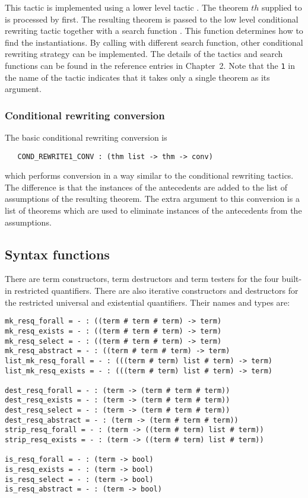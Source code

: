 This tactic is implemented using a lower level tactic .
The theorem $th$ supplied to  is processed by
 first. The resulting theorem is passed to the low
level conditional rewriting tactic  together with a
search function . This function determines how to
find the instantiations. By calling  with different
search function, other conditional rewriting strategy can be
implemented. The details of the tactics and search functions can be
found in the reference entries in Chapter~2.
Note that the {\tt 1} in the name of the tactic indicates that it
takes only a single theorem as its argument.

\subsubsection{Conditional rewriting conversion}

The basic conditional rewriting conversion is
\begin{boxed}
\begin{verbatim}
   COND_REWRITE1_CONV : (thm list -> thm -> conv)
\end{verbatim}
\end{boxed}
which performs conversion in a way similar to the conditional
rewriting tactics. The difference is that the instances of the
antecedents are added to the list of assumptions of the resulting theorem. The
extra argument to this conversion is a list of theorems which are
used to eliminate instances of the antecedents from the assumptions.

\subsection{Syntax functions}

There are term constructors, term destructors and term testers for the
four built-in restricted quantifiers. There are also iterative
constructors and destructors for the restricted universal and
existential quantifiers. Their names and types are:
\begin{boxed}
\begin{verbatim}
mk_resq_forall = - : ((term # term # term) -> term)
mk_resq_exists = - : ((term # term # term) -> term)
mk_resq_select = - : ((term # term # term) -> term)
mk_resq_abstract = - : ((term # term # term) -> term)
list_mk_resq_forall = - : (((term # term) list # term) -> term)
list_mk_resq_exists = - : (((term # term) list # term) -> term)

dest_resq_forall = - : (term -> (term # term # term))
dest_resq_exists = - : (term -> (term # term # term))
dest_resq_select = - : (term -> (term # term # term))
dest_resq_abstract = - : (term -> (term # term # term))
strip_resq_forall = - : (term -> ((term # term) list # term))
strip_resq_exists = - : (term -> ((term # term) list # term))

is_resq_forall = - : (term -> bool)
is_resq_exists = - : (term -> bool)
is_resq_select = - : (term -> bool)
is_resq_abstract = - : (term -> bool)
\end{verbatim}
\end{boxed}

